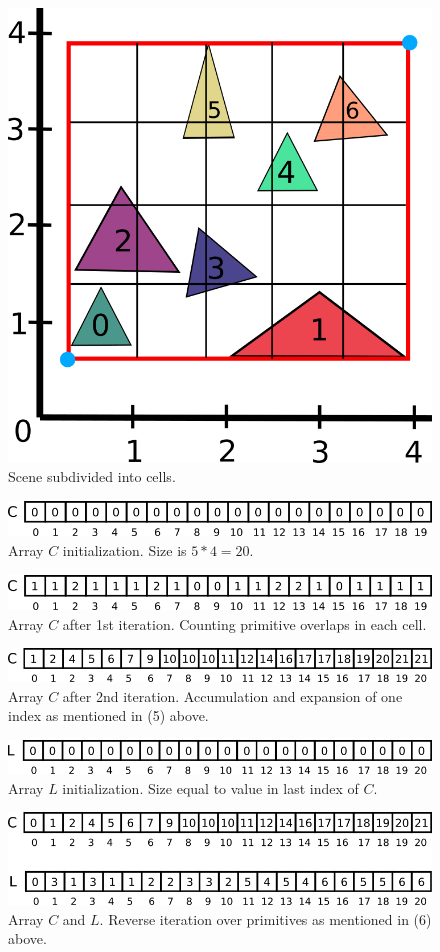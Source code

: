 \documentclass[11pt,a4paper]{article}
\begin{document}
\begin{figure}[H]
	\centering
	\captionsetup{justification=centering}
	\includegraphics[width=.3\textwidth]{compact_grid_3}\quad
	\caption{Scene subdivided into cells.}
\end{figure}
\noindent
\begin{figure}[H]
	\centering
	\captionsetup{justification=centering}
	\includegraphics[width=.65\textwidth]{compact_grid_4}\quad
	\caption{Array $C$ initialization. Size is $5 * 4 = 20$.}
\end{figure}
\noindent
\begin{figure}[H]
	\centering
	\captionsetup{justification=centering}
	\includegraphics[width=.65\textwidth]{compact_grid_5}\quad
	\caption{Array $C$ after 1st iteration. Counting primitive overlaps in each cell.}
\end{figure}
\begin{figure}[H]
	\centering
	\captionsetup{justification=centering}
	\includegraphics[width=.65\textwidth]{compact_grid_6}\quad
	\caption{Array $C$ after 2nd iteration. Accumulation and expansion of one index as mentioned in (5) above.}
\end{figure}
\begin{figure}[H]
	\centering
	\captionsetup{justification=centering}
	\includegraphics[width=.65\textwidth]{compact_grid_7}\quad
	\caption{Array $L$ initialization. Size equal to value in last index of $C$.}
\end{figure}
\begin{figure}[H]
	\centering
	\captionsetup{justification=centering}
	\includegraphics[width=.7\textwidth]{compact_grid_8}\quad
	\caption{Array $C$ and $L$. Reverse iteration over primitives as mentioned in (6) above.}
\end{figure}
\end{document}
